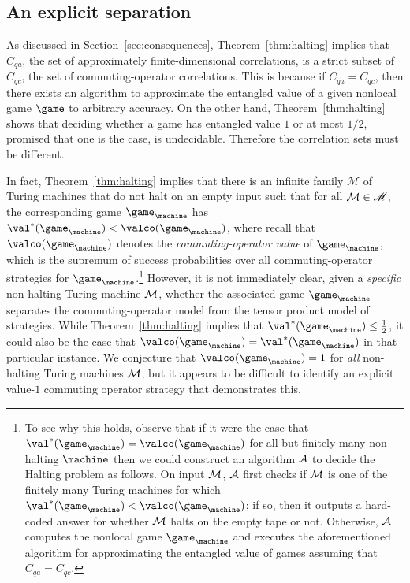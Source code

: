 \subsection{An explicit separation}
\label{sec:separation}

As discussed in Section~\ref{sec:consequences}, Theorem~\ref{thm:halting}
implies that $C_{qa}$, the set of approximately finite-dimensional correlations,
is a strict subset of $C_{qc}$, the set of commuting-operator correlations.
This is because if $C_{qa} = C_{qc}$, then there exists an algorithm to
approximate the entangled value of a given nonlocal game $\game$ to arbitrary
accuracy.
On the other hand, Theorem~\ref{thm:halting} shows that deciding whether a game
has entangled value $1$ or at most $1/2$, promised that one is the case, is
undecidable.
Therefore the correlation sets must be different. 

In fact, Theorem~\ref{thm:halting} implies that there is an infinite family
$\mathscr{M}$ of Turing machines that do not halt on an empty input such
that for all $\cal{M} \in \mathscr{M}$, the corresponding game $\game_\machine$
has $\val^*(\game_\machine) < \valco(\game_\machine)$, where recall that
$\valco(\game_\machine)$ denotes the \emph{commuting-operator value} of
$\game_\machine$, which is the supremum of success probabilities over all
commuting-operator strategies for $\game_\machine$.\footnote{To see why this
  holds, observe that if it were the case that $\val^*(\game_\machine) =
  \valco(\game_\machine)$ for all but finitely many non-halting $\machine$
  then we could construct an algorithm $\cal{A}$ to decide the Halting problem
  as follows.
  On input $\cal{M}$, $\cal{A}$ first checks if $\cal{M}$ is one of the finitely
  many Turing machines for which $\val^*(\game_\machine) <
  \valco(\game_\machine)$; if so, then it outputs a hard-coded answer for
  whether $\cal{M}$ halts on the empty tape or not.
  Otherwise, $\cal{A}$ computes the nonlocal game $\game_\machine$ and executes
  the aforementioned algorithm for approximating the entangled value of games
  assuming that $C_{qa} = C_{qc}$.
}
However, it is not immediately clear, given a \emph{specific} non-halting Turing
machine $\cal{M}$, whether the associated game $\game_\machine$ separates the
commuting-operator model from the tensor product model of strategies.
While Theorem~\ref{thm:halting} implies that $\val^*(\game_\machine) \leq
\frac{1}{2}$, it could also be the case that $\valco(\game_\machine) =
\val^*(\game_\machine)$ in that particular instance.
We conjecture that $\valco(\game_\machine) = 1$ for \emph{all} non-halting
Turing machines $\cal{M}$, but it appears to be difficult to identify an
explicit value-$1$ commuting operator strategy that demonstrates this.

